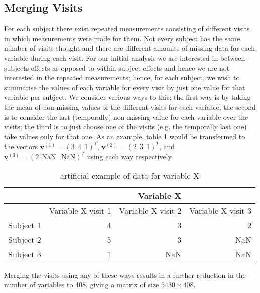 \documentclass{article}
\begin{document}
\subsection*{Merging Visits}
For each subject there exist repeated measurements consisting of different visits in which measurements were made for them. Not every subject has the same number of visits thought and there are different amounts of missing data for each variable during each visit. For our initial analysis we are interested in between-subjects effects as opposed to within-subject effects and hence we are not interested in the repeated measurements; hence, for each subject, we wish to summarise the values of each variable for every visit by just one value for that variable per subject. We consider various ways to this; the first way is by taking the mean of non-missing values of the different visits for each variable; the second is to consider the last (temporally) non-missing value for each variable over the visits; the third is to just choose one of the visits (e.g. the temporally last one) take values only for that one. As an example, table \ref{table:visits} would be transformed to the vectors $\bm{v}^{(1)} =(3 \ \ 4 \ \ 1)^T$, $\bm{v}^{(2)} =(2 \ \ 3 \ \ 1)^T$, and $\bm{v}^{(3)} =(2 \ \ \text{NaN} \ \ \text{ NaN})^T$ using each way respectively. 
\begin{table}
\centering
\begin{tabular} {|r|rrr|}
\hline
& & Variable X & \\
\hline
& Variable X visit 1 & Variable X visit 2  & Variable X visit 3 \\
\hline
Subject 1 & 4 & 3  & 2 \\ 
Subject 2 & 5 & 3 & NaN \\
Subject 3 & 1 & NaN & NaN \\
\hline
\end{tabular}
\caption{artificial example of data for variable X}
\label{table:visits}
\end{table}  
Merging the visits using any of these ways results in a further reduction in the number of variables to 408, giving a matrix of size $5430\times 408$. 
\end{document}
